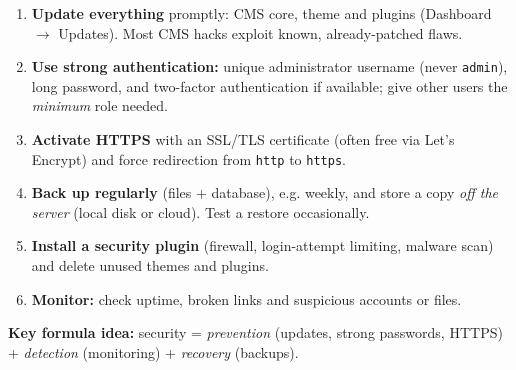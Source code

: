 \documentclass[11pt]{article}
\begin{document}
\begin{methode}
\begin{enumerate}
\item \textbf{Update everything} promptly: CMS core, theme and plugins (Dashboard $\rightarrow$ Updates). Most CMS hacks exploit known, already-patched flaws.
\item \textbf{Use strong authentication:} unique administrator username (never \texttt{admin}), long password, and two-factor authentication if available; give other users the \emph{minimum} role needed.
\item \textbf{Activate HTTPS} with an SSL/TLS certificate (often free via Let's Encrypt) and force redirection from \texttt{http} to \texttt{https}.
\item \textbf{Back up regularly} (files + database), e.g. weekly, and store a copy \emph{off the server} (local disk or cloud). Test a restore occasionally.
\item \textbf{Install a security plugin} (firewall, login-attempt limiting, malware scan) and delete unused themes and plugins.
\item \textbf{Monitor:} check uptime, broken links and suspicious accounts or files.
\end{enumerate}
\textbf{Key formula idea:} security = \emph{prevention} (updates, strong passwords, HTTPS) + \emph{detection} (monitoring) + \emph{recovery} (backups).
\end{methode}
\end{document}
